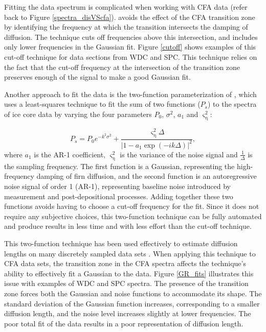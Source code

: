 \documentclass[draft, jgrga]{AGUTeX}
\begin{document}
\begin{article}
Fitting the data spectrum is complicated when working with CFA data (refer back to Figure \ref{spectra_disVScfa}). \citet{Jones2017a} avoids the effect of the CFA transition zone by identifying the frequency at which the transition intersects the damping of diffusion. The technique cuts off frequencies above this intersection, and includes only lower frequencies in the Gaussian fit. Figure \ref{cutoff} shows examples of this cut-off technique for data sections from WDC and SPC. This technique relies on the fact that the cut-off frequency at the intersection of the transition zone preserves enough of the signal to make a good Gaussian fit.

Another approach to fit the data is the two-function parameterization of \citet{Gkinis2014}, which uses a least-squares technique to fit the sum of two functions ($P_s$) to the spectra of ice core data by varying the four parameters $P_0$, $\sigma^2$, $a_1$ and $\varsigma_{\mathrm{\eta}}^2$:

\begin{equation}
P_s =    P_0 {e}^{-k^2 \sigma^2} + \frac{\varsigma_{\mathrm{\eta}}^2 \Delta}
{\left| 1-a_1 \exp{\left( -i k  \Delta \right) } \right|^2},
\label{eq:powerspectrum}
\end{equation}
where $a_1$ is the AR-1 coefficient, $\varsigma_{\mathrm{\eta}}^2$ is the variance of the noise signal and $\frac{1}{\Delta}$ is the sampling frequency. The first function is a Gaussian, representing the high-frequency damping of firn diffusion, and the second function is an autoregressive noise signal of order 1 (AR-1), representing baseline noise introduced by measurement and post-depositional processes. Adding together these two functions avoids having to choose a cut-off frequency for the fit. Since it does not require any subjective choices, this two-function technique can be fully automated and produce results in less time and with less effort than the cut-off technique.

This two-function technique has been used effectively to estimate diffusion lengths on many discretely sampled data sets \citep{Gkinis2014,Holme2017}. When applying this technique to CFA data sets, the transition zone in the CFA spectra affects the technique's ability to effectively fit a Gaussian to the data. Figure \ref{GR_fits} illustrates this issue with examples of WDC and SPC spectra. The presence of the transition zone forces both the Gaussian and noise functions to accommodate its shape. The standard deviation of the Gaussian function increases, corresponding to a smaller diffusion length, and the noise level increases slightly at lower frequencies. The poor total fit of the data results in a poor representation of diffusion length.


\end{article}
\end{document}
